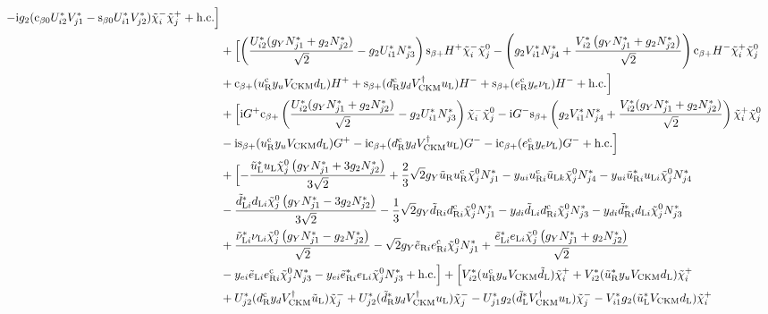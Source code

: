 \documentclass[CheatSheet]{subfiles}
\begin{document}
\begin{equation}
\begin{split}
  -\ii g_2 (\co{\beta0} U_{i2}^* V_{j1}^*-\si{\beta0} U_{i1}^* V_{j2}^*){\charM[i]\charP[j]}
  +\text{h.c.}
\Bigr]
\\&
+\Bigl[
    \left(\frac{U_{i2}^* (g_Y N_{j1}^*+g_2 N_{j2}^*)}{\sqrt{2}}-g_2  U_{i1}^* N_{j3}^*\right)  \si{\beta+}{H^{+}\charM[i]\neut[j]}
  - \left(g_2 V_{i1}^* N_{j4}^*+\frac{V_{i2}^* \left(g_Y N_{j1}^*+g_2 N_{j2}^*\right)}{\sqrt2}\right)\co{\beta+} {H^{-}\charP[i]\neut[j]}
  \\&
  + \co{\beta+} (\uR^{\cc}\yu V\w{CKM} \dL)H^+
  + \si{\beta+} (\dR^{\cc}\yd V\w{CKM}^\dagger \uL)H^-
  + \si{\beta+} (\eR^{\cc}\ye\nuL)H^-
+\text{h.c.}
\Bigr]
\\&+
\Bigl[
    \ii G^+\co{\beta+}  \left(\frac{U_{i2}^* (g_Y N_{j1}^*+g_2 N_{j2}^*)}{\sqrt2}-g_2 U_{i1}^* N_{j3}^*\right)  {\charM[i]\neut[j]}
  - \ii G^-\si{\beta+} \left(g_2 V_{i1}^* N_{j4}^*+\frac{V_{i2}^* (g_Y N_{j1}^*+g_2 N_{j2}^*)}{\sqrt{2}}\right) \charP[i]\neut[j]
  \\&
  - \ii \si{\beta+} (\uR^{\cc}\yu V\w{CKM} \dL)G^+
  - \ii \co{\beta+} (\dR^{\cc}\yd V\w{CKM}^\dagger \uL)G^-
  - \ii \co{\beta+} (\eR^{\cc}\ye\nuL)G^-
  + \text{h.c.}
\Bigr]
\\&
+\Bigl[
  -\frac{{\tuL^{*}\uL\neut[j]} \left(g_Y N_{j1}^*+3 g_2 N_{j2}^*\right)}{3 \sqrt{2}}
  +\frac{2}{3} \sqrt{2} g_Y {\tuR\uR^{\cc}\neut[j]} N_{j1}^*
  -{\yu[i]\uR[i]^{\cc}\tuL[k]\neut[j]} N_{j4}^*
  -{\yu[i]\tuR[i]^{*}\uL[i]\neut[j]} N_{j4}^*
  \\&
  -\frac{{\tdL[i]^{*}\dL[i]\neut[j]} \left(g_Y N_{j1}^*-3 g_2 N_{j2}^*\right)}{3 \sqrt{2}}
  -\frac{1}{3} \sqrt{2} g_Y {\tdR[i]\dR[i]^{\cc}\neut[j]} N_{j1}^*
  -{\yd[i]\tdL[i]\dR[i]^{\cc}\neut[j]} N_{j3}^*
  -{\yd[i]\tdR[i]^{*}\dL[i]\neut[j]} N_{j3}^*
  \\&
  +\frac{{\tnuL[i]^{*}\nuL[i]\neut[j]} \left(g_Y N_{j1}^*-g_2 N_{j2}^*\right)}{\sqrt{2}}
  -\sqrt{2} g_Y {\teR[i]\eR[i]^{\cc }\neut[j]} N_{j1}^*
  +\frac{{\teL[i]^{*}\eL[i]\neut[j]} \left(g_Y N_{j1}^*+g_2 N_{j2}^*\right)}{\sqrt{2}}
  \\&
  -{\ye[i]\teL[i]\eR[i]^{\cc }\neut[j]} N_{j3}^*
  -{\ye[i]\teR[i]^{*}\eL[i]\neut[j]} N_{j3}^*
  +\text{h.c.}
\Bigr]
+\Bigl[
  V_{i2}^*{(\uR^{\cc}\yu V\w{CKM}\tdL)\charP[i]}
+ V_{i2}^*{(\tuR^{*}\yu V\w{CKM}\dL)\charP[i]}
  \\&
+ U_{j2}^* {(\dR^{\cc}\yd V\w{CKM}^\dagger \tuL)\charM[j]}
+ U_{j2}^* {(\tdR^{*}\yd V\w{CKM}^\dagger \uL)\charM[j]}
- U_{j1}^* g_2 {(\tdL^{*}V\w{CKM}^\dagger\uL)\charM[j]}
- V_{i1}^* g_2 {(\tuL^{*}V\w{CKM}\dL)\charP[i]}

\end{split}
\end{equation}
\end{document}
